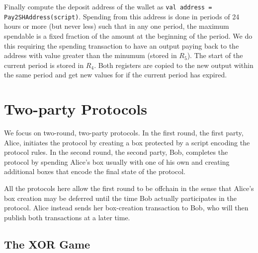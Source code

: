 \documentclass[11pt]{article}
\begin{document}
Finally compute the deposit address of the wallet as \texttt{val address = Pay2SHAddress(script)}. %
Spending from this address is done in periods of 24 hours or more (but never less) such that in any one period, the maximum spendable is a fixed fraction of the amount at the beginning of the period. We do this requiring the spending transaction to have an output paying back to the address with value greater than the minumum (stored in $R_5$). The start of the current period is stored in $R_4$. Both registers are copied to the new output within the same period and get new values for if the current period has expired.


%
%


\section{Two-party Protocols}

We focus on two-round, two-party protocols. %
In the first round, the first party, Alice, initiates the protocol by creating a box  protected by a script encoding the protocol rules. In the second round, the second party, Bob, completes the protocol by spending Alice's box usually with one of his own and creating additional boxes that encode the final state of the protocol. 

All the protocols here allow the first round to be offchain in the sense that Alice's box creation may be deferred until the time Bob actually participates in the protocol. Alice instead sends her box-creation transaction to Bob, who will then publish both transactions at a later time. 
\subsection{The XOR Game}
\end{document}
